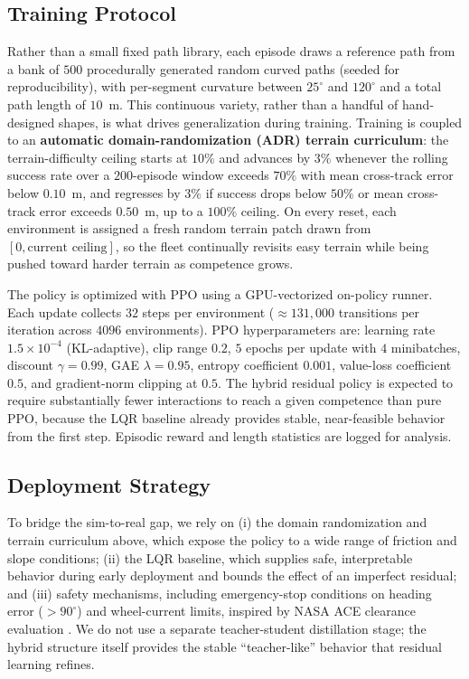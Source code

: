 \documentclass[conference]{IEEEtran}
\begin{document}
\subsection{Training Protocol}
\label{sec:training}
Rather than a small fixed path library, each episode draws a reference path from a bank of $500$ procedurally generated random curved paths (seeded for reproducibility), with per-segment curvature between $25^\circ$ and $120^\circ$ and a total path length of $10$~m. This continuous variety, rather than a handful of hand-designed shapes, is what drives generalization during training. Training is coupled to an \textbf{automatic domain-randomization (ADR) terrain curriculum}: the terrain-difficulty ceiling starts at $10\%$ and advances by $3\%$ whenever the rolling success rate over a $200$-episode window exceeds $70\%$ with mean cross-track error below $0.10$~m, and regresses by $3\%$ if success drops below $50\%$ or mean cross-track error exceeds $0.50$~m, up to a $100\%$ ceiling. On every reset, each environment is assigned a fresh random terrain patch drawn from $[0, \text{current ceiling}]$, so the fleet continually revisits easy terrain while being pushed toward harder terrain as competence grows.

The policy is optimized with PPO \cite{schulman2017proximal} using a GPU-vectorized on-policy runner. Each update collects $32$ steps per environment ($\approx 131{,}000$ transitions per iteration across $4096$ environments). PPO hyperparameters are: learning rate $1.5\times10^{-4}$ (KL-adaptive), clip range $0.2$, $5$ epochs per update with $4$ minibatches, discount $\gamma=0.99$, GAE $\lambda=0.95$, entropy coefficient $0.001$, value-loss coefficient $0.5$, and gradient-norm clipping at $0.5$. The hybrid residual policy is expected to require substantially fewer interactions to reach a given competence than pure PPO, because the LQR baseline already provides stable, near-feasible behavior from the first step. Episodic reward and length statistics are logged for analysis.

\subsection{Deployment Strategy}
To bridge the sim-to-real gap, we rely on (i) the domain randomization and terrain curriculum above, which expose the policy to a wide range of friction and slope conditions; (ii) the LQR baseline, which supplies safe, interpretable behavior during early deployment and bounds the effect of an imperfect residual; and (iii) safety mechanisms, including emergency-stop conditions on heading error ($>90^\circ$) and wheel-current limits, inspired by NASA ACE clearance evaluation \cite{nasaACE}. We do not use a separate teacher-student distillation stage; the hybrid structure itself provides the stable ``teacher-like'' behavior that residual learning refines.
\end{document}

